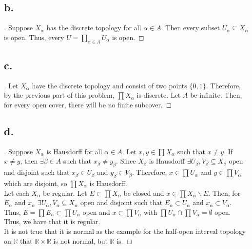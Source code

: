 \documentclass{article}
\begin{document}
\subsection*{b.}
\begin{proof}[\unskip\nopunct]

    Suppose $X_{\alpha}$ has the discrete topology for all $\alpha \in A$. Then every subset $U_{\alpha} \subseteq X_{\alpha}$ is open. Thus, every $U = \prod\limits_{\alpha \in A} U_{\alpha}$ is open.
    
\end{proof}

\subsection*{c.}
\begin{proof}[\unskip\nopunct]
    Let $X_{\alpha}$ have the discrete topology and consist of two points $\{0, 1\}$. Therefore, by the previous part of this problem, $\prod X_{\alpha}$ is discrete. Let $A$ be infinite. Then, for every open cover, there will be no finite subcover. 
    
\end{proof}

\subsection*{d.}
\begin{proof}[\unskip\nopunct]
    Suppose $X_{\alpha}$ is Hausdorff for all $\alpha \in A$. 
    Let $x, y \in \prod X_{\alpha}$ such that $x \neq y$. If $x \neq y$, then $\exists \beta \in A$ such that $x_{\beta} \neq y_{\beta}$. Since $X_{\beta}$ is Hausdorff $\exists U_{\beta}, V_{\beta} \subseteq X_\beta$ open and disjoint such that $x_{\beta} \in U_{\beta}$ and $y_{\beta} \in V_{\beta}$. Therefore, $x \in \prod U_{\alpha}$ and $y \in \prod V_{\alpha}$ which are disjoint, so $\prod X_{\alpha}$ is Hausdorff. \\
    Let each $X_{\alpha}$ be regular. Let $E \subset \prod X_{\alpha}$
    be closed and $x \in \prod X_{\alpha} \backslash E$. Then, for $E_{\alpha}$ and $x_{\alpha}$ $\exists U_{\alpha}, V_{\alpha} \subseteq X_{\alpha}$
    open and disjoint such that $E_{\alpha} \subset U_{\alpha}$ and $x_{\alpha} \subset V_{\alpha}$. Thus, 
    $E = \prod E_{\alpha} \subset \prod U_{\alpha}$ open and $x \subset \prod V_{\alpha}$ with $\prod U_{\alpha}\cap \prod V_{\alpha} = \emptyset$ open. Thus, we have that it is regular. \\
    It is not true that it is normal as the example for the half-open interval topology on $\mathbb{R}$ that $\mathbb{R} \times \mathbb{R}$ is not normal, but $\mathbb{R}$ is.  

\end{proof}
\end{document}
